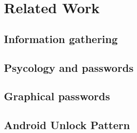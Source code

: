 \chapter{Related Work}

	\section{Information gathering}

	\section{Psycology and passwords}

	\section{Graphical passwords}

	\section{Android Unlock Pattern}